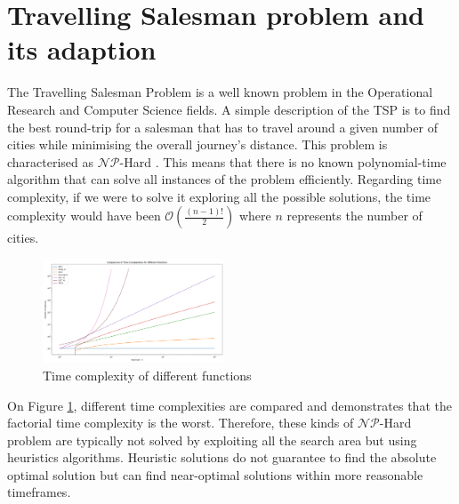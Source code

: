 \documentclass[conference]{IEEEtran}
\begin{document}

\section{Travelling Salesman problem and its adaption}
\label{sec:TSP}

The Travelling Salesman Problem is a well known problem in the Operational Research and Computer Science fields. A simple description of the TSP is to find the best round-trip for a salesman that has to travel around a given number of cities while minimising the overall journey's distance. This problem is characterised as $\mathcal{NP}$-Hard \cite{np_hardness}. This means that there is no known polynomial-time algorithm that can solve all instances of the problem efficiently. Regarding time complexity, if we were to solve it exploring all the possible solutions, the time complexity would have been $\mathcal{O}(\frac{(n-1)!}{2})$ where $n$ represents the number of cities.

\begin{figure}
    \centering
    \includegraphics[width=0.48\textwidth]{Figures/Time_complexities.png}
    \caption{Time complexity of different functions}
    \label{fig:time_complexity_comparisons}
\end{figure}

On Figure \ref{fig:time_complexity_comparisons}, different time complexities are compared and demonstrates that the factorial time complexity is the worst. Therefore, these kinds of $\mathcal{NP}$-Hard problem are typically not solved by exploiting all the search area but using heuristics algorithms. Heuristic solutions do not guarantee to find the absolute optimal solution but can find near-optimal solutions within more reasonable timeframes.
\end{document}
